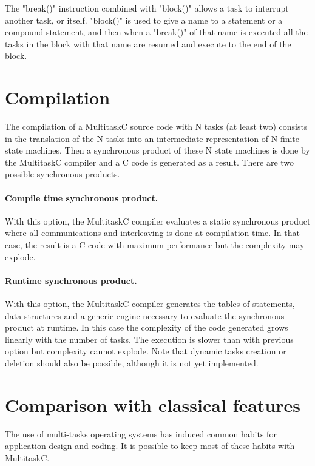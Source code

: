 \documentclass[10pt]{report}
\begin{document}
The "break()" instruction combined with "block()" allows a task to interrupt another task, or itself. "block()"
is used to give a name to a statement or a compound statement, and then when a "break()" of that name is executed 
all the tasks in the block with that name are resumed and execute to the end of the block.

\section{Compilation}

The compilation of a MultitaskC source code with N tasks (at least two) consists in the translation of the N tasks 
into an intermediate representation of N finite state machines. Then a synchronous product of these N state machines 
is done by the MultitaskC compiler and a C code is generated as a result. There are two possible synchronous products.

\paragraph{Compile time synchronous product.} With this option, the MultitaskC compiler evaluates a static
synchronous product where all communications and interleaving is done at compilation time. In that case, the result is 
a C code with maximum performance but the complexity may explode.

\paragraph{Runtime synchronous product.} With this option, the MultitaskC compiler generates the tables of statements, 
data structures and a generic engine necessary to evaluate the synchronous product at runtime. In this case
the complexity of the code generated grows linearly with the number of tasks. The execution is slower than with
previous option but complexity cannot explode. Note that dynamic tasks creation or deletion should also 
be possible, although it is not yet implemented.

\section{Comparison with classical features}

The use of multi-tasks operating systems has induced common habits for application design and coding. It is
possible to keep most of these habits with MultitaskC.
\end{document}
